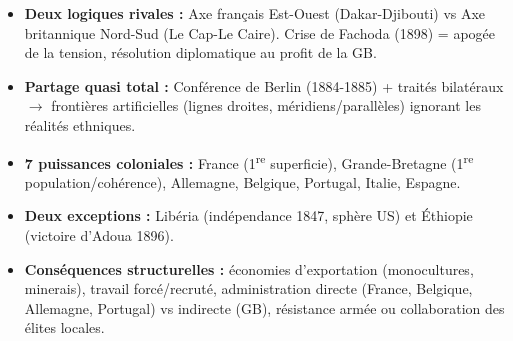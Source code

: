 \documentclass[11pt]{article}
\newcommand{\cle}[1]{{\popxbold\color{popdark}#1}}
\begin{document}
\begin{aretenir}
\begin{itemize}
    \item \textbf{Deux logiques rivales :} Axe français Est-Ouest (Dakar-Djibouti) vs Axe britannique Nord-Sud (Le Cap-Le Caire). Crise de Fachoda (1898) = apogée de la tension, résolution diplomatique au profit de la GB.
    \item \textbf{Partage quasi total :} Conférence de Berlin (1884-1885) + traités bilatéraux $\rightarrow$ frontières artificielles (lignes droites, méridiens/parallèles) ignorant les réalités ethniques.
    \item \textbf{7 puissances coloniales :} France (1\textsuperscript{re} superficie), Grande-Bretagne (1\textsuperscript{re} population/cohérence), Allemagne, Belgique, Portugal, Italie, Espagne.
    \item \textbf{Deux exceptions :} \cle{Libéria} (indépendance 1847, sphère US) et \cle{Éthiopie} (victoire d'Adoua 1896).
    \item \textbf{Conséquences structurelles :} économies d'exportation (monocultures, minerais), travail forcé/recruté, administration directe (France, Belgique, Allemagne, Portugal) vs indirecte (GB), résistance armée ou collaboration des élites locales.
\end{itemize}
\end{aretenir}
\end{document}
